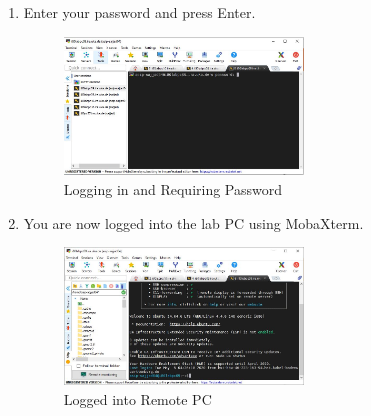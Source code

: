 \begin{enumerate}[resume]
	\item Enter your password and press Enter.
\begin{figure}[!htb]
	\centering
	\includegraphics[width=0.6\textwidth]{src/images/image16.JPG}
	\caption{Logging in and Requiring Password}
	\label{fig:fig16}
\end{figure}
	\item You are now logged into the lab PC using MobaXterm.
\begin{figure}[!htb]
	\centering
	\includegraphics[width=0.6\textwidth]{src/images/image17.JPG}
	\caption{Logged into Remote PC}
	\label{fig:fig17}
\end{figure}
\end{enumerate}
